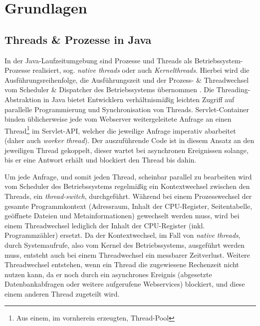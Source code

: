 
\section{Grundlagen}
\label{section:grundlagen}

\subsection{Threads \& Prozesse in Java}
\label{sections:treads_prozesse}
In der Java-Laufzeitumgebung sind Prozesse und Threads als Betriebssystem-Prozesse realisiert, sog. \textit{native threads} oder auch \textit{Kernelthreads}.
Hierbei wird die Ausführungsreihenfolge, die Ausführungszeit und der Prozess- \& Threadwechsel
vom Scheduler \& Dispatcher des Betriebssystems übernommen \parencite{Tanenbaum2016}.
Die Threading-Abstraktion in Java bietet Entwicklern verhältnismäßig leichten Zugriff auf parallelle Programmierung und Synchronisation von Threads.\newline
Servlet-Container binden üblicherweise jede vom Webserver weitergeleitete Anfrage an einen
Thread\footnote{Aus einem, im vornherein erzeugten, Thread-Pool} im Servlet-API, welcher die jeweilige Anfrage imperativ abarbeitet
(daher auch \textit{worker thread}).\newline
Der auszuführende Code ist in diesem Ansatz an den jeweiligen Thread gekoppelt, dieser wartet bei
asynchronen Ereignissen solange, bis er eine Antwort erhält und blockiert den Thread bis dahin.

Um jede Anfrage, und somit jeden Thread, scheinbar parallel zu bearbeiten wird vom Scheduler
des Betriebssystems regelmäßig ein Kontextwechsel zwischen den Threads,
ein \textit{thread-switch}, durchgeführt. Während bei einem Prozesswechsel der gesamte Programmkontext (Adressraum, Inhalt der CPU-Register,
Seitentabelle, geöffnete Dateien und Metainformationen)
gewechselt werden muss, wird bei einem Threadwechsel lediglich der Inhalt der CPU-Register (inkl. Programmzähler) ersetzt\parencite{Brosenne2021}.
Da der Kontextwechsel, im Fall von \textit{native threads}, durch Systemaufrufe, also vom Kernel des Betriebssystems, ausgeführt werden muss, entsteht auch
bei einem Threadwechsel ein messbarer Zeitverlust.\newline
Weitere Threadwechsel entstehen, wenn ein Thread die zugewiesene Rechenzeit nicht nutzen kann, da er noch durch ein asynchrones Ereignis
(abgesetzte Datenbankabfragen oder weitere aufgerufene Webservices) blockiert, und diese einem anderen Thread zugeteilt wird.

